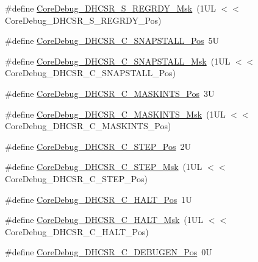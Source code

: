 \begin{DoxyCompactItemize}
\item 
\#define \hyperlink{group___c_m_s_i_s___core_debug_gac4cd6f3178de48f473d8903e8c847c07}{Core\+Debug\+\_\+\+D\+H\+C\+S\+R\+\_\+\+S\+\_\+\+R\+E\+G\+R\+D\+Y\+\_\+\+Msk}~(1\+U\+L $<$$<$ Core\+Debug\+\_\+\+D\+H\+C\+S\+R\+\_\+\+S\+\_\+\+R\+E\+G\+R\+D\+Y\+\_\+\+Pos)
\item 
\#define \hyperlink{group___c_m_s_i_s___core_debug_ga85747214e2656df6b05ec72e4d22bd6d}{Core\+Debug\+\_\+\+D\+H\+C\+S\+R\+\_\+\+C\+\_\+\+S\+N\+A\+P\+S\+T\+A\+L\+L\+\_\+\+Pos}~5U
\item 
\#define \hyperlink{group___c_m_s_i_s___core_debug_ga53aa99b2e39a67622f3b9973e079c2b4}{Core\+Debug\+\_\+\+D\+H\+C\+S\+R\+\_\+\+C\+\_\+\+S\+N\+A\+P\+S\+T\+A\+L\+L\+\_\+\+Msk}~(1\+U\+L $<$$<$ Core\+Debug\+\_\+\+D\+H\+C\+S\+R\+\_\+\+C\+\_\+\+S\+N\+A\+P\+S\+T\+A\+L\+L\+\_\+\+Pos)
\item 
\#define \hyperlink{group___c_m_s_i_s___core_debug_ga0d2907400eb948a4ea3886ca083ec8e3}{Core\+Debug\+\_\+\+D\+H\+C\+S\+R\+\_\+\+C\+\_\+\+M\+A\+S\+K\+I\+N\+T\+S\+\_\+\+Pos}~3U
\item 
\#define \hyperlink{group___c_m_s_i_s___core_debug_ga77fe1ef3c4a729c1c82fb62a94a51c31}{Core\+Debug\+\_\+\+D\+H\+C\+S\+R\+\_\+\+C\+\_\+\+M\+A\+S\+K\+I\+N\+T\+S\+\_\+\+Msk}~(1\+U\+L $<$$<$ Core\+Debug\+\_\+\+D\+H\+C\+S\+R\+\_\+\+C\+\_\+\+M\+A\+S\+K\+I\+N\+T\+S\+\_\+\+Pos)
\item 
\#define \hyperlink{group___c_m_s_i_s___core_debug_gae1fc39e80de54c0339cbb1b298a9f0f9}{Core\+Debug\+\_\+\+D\+H\+C\+S\+R\+\_\+\+C\+\_\+\+S\+T\+E\+P\+\_\+\+Pos}~2U
\item 
\#define \hyperlink{group___c_m_s_i_s___core_debug_gae6bda72fbd32cc5734ff3542170dc00d}{Core\+Debug\+\_\+\+D\+H\+C\+S\+R\+\_\+\+C\+\_\+\+S\+T\+E\+P\+\_\+\+Msk}~(1\+U\+L $<$$<$ Core\+Debug\+\_\+\+D\+H\+C\+S\+R\+\_\+\+C\+\_\+\+S\+T\+E\+P\+\_\+\+Pos)
\item 
\#define \hyperlink{group___c_m_s_i_s___core_debug_gaddf1d43f8857e4efc3dc4e6b15509692}{Core\+Debug\+\_\+\+D\+H\+C\+S\+R\+\_\+\+C\+\_\+\+H\+A\+L\+T\+\_\+\+Pos}~1U
\item 
\#define \hyperlink{group___c_m_s_i_s___core_debug_ga1d905a3aa594eb2e8bb78bcc4da05b3f}{Core\+Debug\+\_\+\+D\+H\+C\+S\+R\+\_\+\+C\+\_\+\+H\+A\+L\+T\+\_\+\+Msk}~(1\+U\+L $<$$<$ Core\+Debug\+\_\+\+D\+H\+C\+S\+R\+\_\+\+C\+\_\+\+H\+A\+L\+T\+\_\+\+Pos)
\item 
\#define \hyperlink{group___c_m_s_i_s___core_debug_gab557abb5b172b74d2cf44efb9d824e4e}{Core\+Debug\+\_\+\+D\+H\+C\+S\+R\+\_\+\+C\+\_\+\+D\+E\+B\+U\+G\+E\+N\+\_\+\+Pos}~0U
$$
\end{DoxyCompactItemize}
